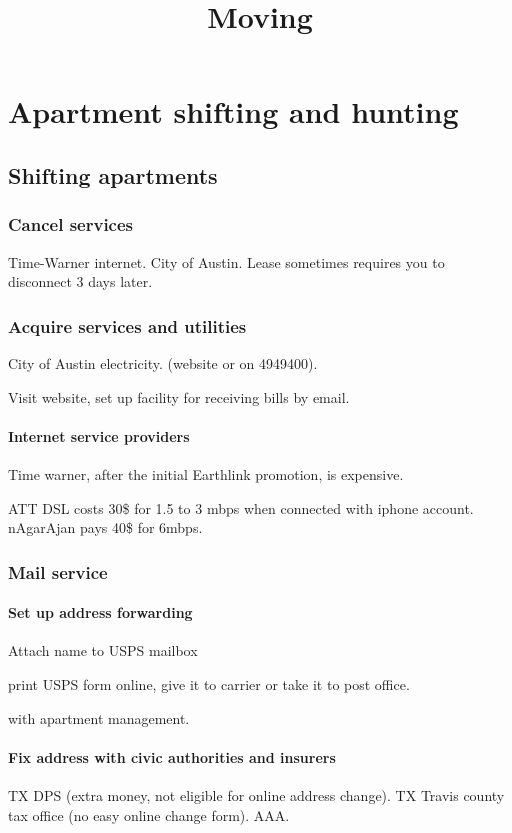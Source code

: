 \documentclass[oneside, article]{memoir}
\title{Moving}
\author{}
\begin{document}
\maketitle

\part{Apartment shifting and hunting}
\chapter{Shifting apartments}
\section{Cancel services}
\subitem Time-Warner internet.
\subitem City of Austin. Lease sometimes requires you to disconnect 3 days later.

\section{ Acquire services and utilities}
City of Austin electricity. (website or on 4949400).

Visit website, set up facility for receiving bills by email.

\subsection{Internet service providers}
Time warner, after the initial Earthlink promotion, is expensive.

ATT DSL costs 30\$ for 1.5 to 3 mbps when connected with iphone account. nAgarAjan pays 40\$ for 6mbps.

\section{Mail service}
\subsection{Set up address forwarding}
Attach name to USPS mailbox

\subitem print USPS form online, give it to carrier or take it to post office.

\subitem with apartment management.

\subsection{ Fix address with civic authorities and insurers}
\subitem TX DPS (extra money, not eligible for online address change).
\subitem TX Travis county tax office (no easy online change form).
\subitem AAA.
\end{document}
